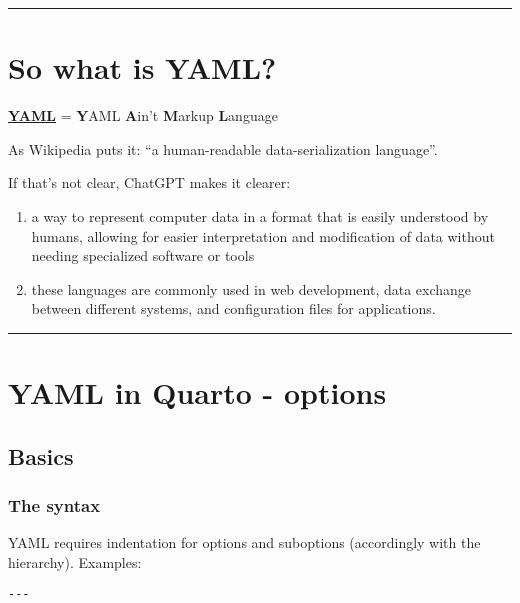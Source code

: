 \documentclass[
  letterpaper,
  DIV=11,
  numbers=noendperiod]{scrartcl}
\begin{document}
\begin{center}\rule{0.5\linewidth}{0.5pt}\end{center}

\hypertarget{so-what-is-yaml}{%
\section{So what is YAML?}\label{so-what-is-yaml}}

\textbf{\href{https://yaml.org/}{YAML}} = \textbf{Y}AML \textbf{A}in't
\textbf{M}arkup \textbf{L}anguage

As Wikipedia puts it: ``a human-readable data-serialization language''.

If that's not clear, ChatGPT makes it clearer:

\begin{enumerate}
\def\labelenumi{\arabic{enumi})}
\item
  a way to represent computer data in a format that is easily understood
  by humans, allowing for easier interpretation and modification of data
  without needing specialized software or tools
\item
  these languages are commonly used in web development, data exchange
  between different systems, and configuration files for applications.
\end{enumerate}

\begin{center}\rule{0.5\linewidth}{0.5pt}\end{center}

\hypertarget{yaml-in-quarto---options}{%
\section{YAML in Quarto - options}\label{yaml-in-quarto---options}}

\hypertarget{basics}{%
\subsection{Basics}\label{basics}}

\hypertarget{the-syntax}{%
\subsubsection{The syntax}\label{the-syntax}}

YAML requires indentation for options and suboptions (accordingly with
the hierarchy). Examples:

\texttt{-\/-\/-}
\end{document}
